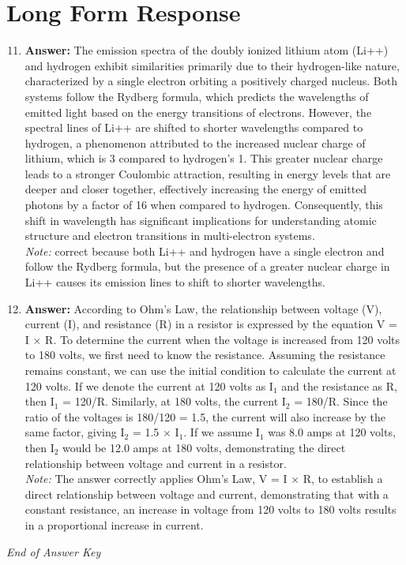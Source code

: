 \documentclass[12pt]{article}
\begin{document}
\section*{Long Form Response}
\begin{enumerate}[label=\arabic*.]
\setcounter{enumi}{10}
\item \textbf{Answer:} The emission spectra of the doubly ionized lithium atom (Li++) and hydrogen exhibit similarities primarily due to their hydrogen-like nature, characterized by a single electron orbiting a positively charged nucleus. Both systems follow the Rydberg formula, which predicts the wavelengths of emitted light based on the energy transitions of electrons. However, the spectral lines of Li++ are shifted to shorter wavelengths compared to hydrogen, a phenomenon attributed to the increased nuclear charge of lithium, which is 3 compared to hydrogen's 1. This greater nuclear charge leads to a stronger Coulombic attraction, resulting in energy levels that are deeper and closer together, effectively increasing the energy of emitted photons by a factor of 16 when compared to hydrogen. Consequently, this shift in wavelength has significant implications for understanding atomic structure and electron transitions in multi-electron systems.
\\ \textit{Note:} correct because both Li++ and hydrogen have a single electron and follow the Rydberg formula, but the presence of a greater nuclear charge in Li++ causes its emission lines to shift to shorter wavelengths.
\item \textbf{Answer:} According to Ohm's Law, the relationship between voltage (V), current (I), and resistance (R) in a resistor is expressed by the equation V = I \ensuremath{\times} R. To determine the current when the voltage is increased from 120 volts to 180 volts, we first need to know the resistance. Assuming the resistance remains constant, we can use the initial condition to calculate the current at 120 volts. If we denote the current at 120 volts as I$_{1}$ and the resistance as R, then I$_{1}$ = 120/R. Similarly, at 180 volts, the current I$_{2}$ = 180/R. Since the ratio of the voltages is 180/120 = 1.5, the current will also increase by the same factor, giving I$_{2}$ = 1.5 \ensuremath{\times} I$_{1}$. If we assume I$_{1}$ was 8.0 amps at 120 volts, then I$_{2}$ would be 12.0 amps at 180 volts, demonstrating the direct relationship between voltage and current in a resistor.
\\ \textit{Note:} The answer correctly applies Ohm's Law, V = I × R, to establish a direct relationship between voltage and current, demonstrating that with a constant resistance, an increase in voltage from 120 volts to 180 volts results in a proportional increase in current.
\end{enumerate}

\vfill
\noindent\textit{End of Answer Key}
\end{document}
